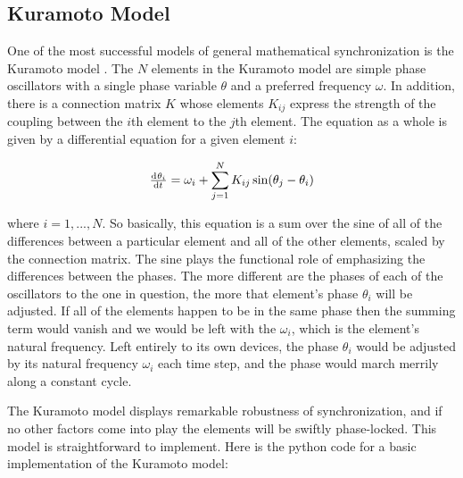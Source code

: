\documentclass[12pt]{article}
\begin{document}
\subsection{Kuramoto Model}

One of the most successful models of general mathematical synchronization is the Kuramoto model \cite{Acebrón} \cite{Ermentrout}.  The $N$ elements in the Kuramoto model are simple phase oscillators with a single phase variable $\theta$ and a preferred frequency $\omega$.  In addition, there is a connection matrix $K$ whose elements $K_{ij}$ express the strength of the coupling between the $i$th element to the $j$th element.  The equation as a whole is given by a differential equation for a given element $i$:

$$ \od{\theta_i}{t}=\omega_i+\sum\limits_{j=1}^N K_{ij}\sin(\theta_j-\theta_i)$$

where $i=1,...,N$.  So basically, this equation is a sum over the sine of all of the differences between a particular element and all of the other elements, scaled by the connection matrix.  The sine plays the functional role of emphasizing the differences between the phases.  The more different are the phases of each of the oscillators to the one in question, the more that element's phase $\theta_i$ will be adjusted.  If all of the elements happen to be in the same phase then the summing term would vanish and we would be left with the $\omega_i$, which is the element's natural frequency.  Left entirely to its own devices, the phase $\theta_i$ would be adjusted by its natural frequency $\omega_i$ each time step, and the phase would march merrily along a constant cycle.  

The Kuramoto model displays remarkable robustness of synchronization, and if no other factors come into play the elements will be swiftly phase-locked.  This model is straightforward to implement.  Here is the python code for a basic implementation of the Kuramoto model:
\end{document}
